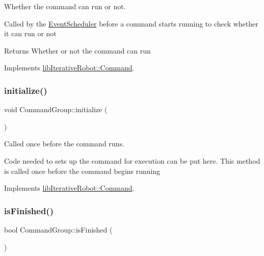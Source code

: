 Whether the command can run or not. 

Called by the \mbox{\hyperlink{classlib_iterative_robot_1_1_event_scheduler}{Event\+Scheduler}} before a command starts running to check whether it can run or not \begin{DoxyReturn}{Returns}
Whether or not the command can run 
\end{DoxyReturn}


Implements \mbox{\hyperlink{classlib_iterative_robot_1_1_command_aebef0fdf029a15ee48fbb778c4265609}{lib\+Iterative\+Robot\+::\+Command}}.

\mbox{\label{classlib_iterative_robot_1_1_command_group_a99800c5dbd05ab750aa0bb27518d0467}} 
\subsubsection{\texorpdfstring{initialize()}{initialize()}}
{\footnotesize\ttfamily void Command\+Group\+::initialize (\begin{DoxyParamCaption}{ }\end{DoxyParamCaption})\hspace{0.3cm}{\ttfamily [virtual]}}



Called once before the command runs. 

Code needed to sets up the command for execution can be put here. This method is called once before the command begins running 

Implements \mbox{\hyperlink{classlib_iterative_robot_1_1_command_a14543c9d38b07e52f9ffb2af88a63f60}{lib\+Iterative\+Robot\+::\+Command}}.

\mbox{\label{classlib_iterative_robot_1_1_command_group_a96807a2763adf9e21ebf2cb9e3574e3c}} 
\subsubsection{\texorpdfstring{isFinished()}{isFinished()}}
{\footnotesize\ttfamily bool Command\+Group\+::is\+Finished (\begin{DoxyParamCaption}{ }\end{DoxyParamCaption})\hspace{0.3cm}{\ttfamily [virtual]}}



